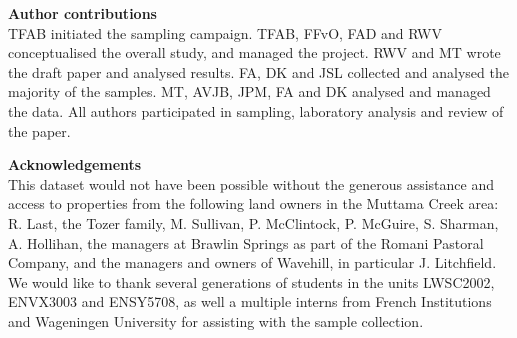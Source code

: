 \documentclass[, manuscript]{copernicus}
\begin{document}
\bigskip

\noindent \textbf{Author contributions}\\
TFAB initiated the sampling campaign. TFAB, FFvO, FAD and RWV
conceptualised the overall study, and managed the project. RWV and MT
wrote the draft paper and analysed results. FA, DK and JSL collected and
analysed the majority of the samples. MT, AVJB, JPM, FA and DK analysed
and managed the data. All authors participated in sampling, laboratory
analysis and review of the paper.

\bigskip

\noindent \textbf{Acknowledgements}\\
This dataset would not have been possible without the generous
assistance and access to properties from the following land owners in
the Muttama Creek area: R. Last, the Tozer family, M. Sullivan, P.
McClintock, P. McGuire, S. Sharman, A. Hollihan, the managers at Brawlin
Springs as part of the Romani Pastoral Company, and the managers and
owners of Wavehill, in particular J. Litchfield. We would like to thank
several generations of students in the units LWSC2002, ENVX3003 and
ENSY5708, as well a multiple interns from French Institutions and
Wageningen University for assisting with the sample collection.









\competinginterests{} %







\end{document}
